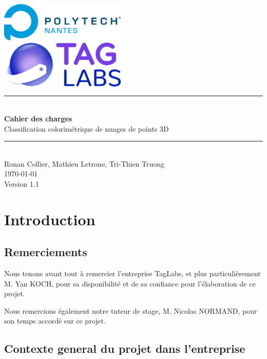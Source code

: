 \documentclass[12pt,titlepage,french]{article}
\begin{document}

\begin{titlepage}
\newcommand{\HRule}{\rule{\linewidth}{0.5mm}}
\center

  \includegraphics[width=0.45\textwidth]{./image2.png}\\[1cm]
   
  \includegraphics[width=0.45\textwidth]{./image1.png}


\HRule \\[0.4cm]
{ \huge \bfseries Cahier des charges \\[0.15cm] }
Classification colorimétrique de nuages de points 3D
\HRule \\[1.5cm]
Ronan Collier,
Mathieu Letrone,
Tri-Thien Truong
\\[1cm]
\today \\ [1cm]
Version 1.1
\end{titlepage}

\section{Introduction}

\subsection*{Remerciements}

Nous tenons avant tout à remercier l'entreprise TagLabs, et plus particulièrement M. Yan KOCH, pour sa disponibilité et de sa confiance pour l'élaboration de ce projet.

Nous remercions également notre tuteur de stage, M. Nicolas NORMAND, pour son temps accordé sur ce projet.

\subsection*{Contexte general du projet dans l'entreprise}
\end{document}
